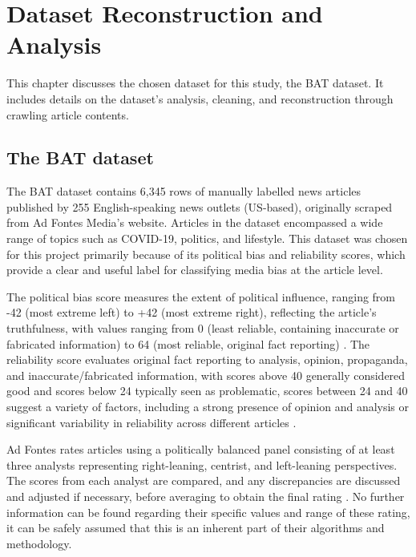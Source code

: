 \chapter{Dataset Reconstruction and Analysis}
\label{cha:3}

This chapter discusses the chosen dataset for this study, the BAT dataset. It includes details on the dataset's analysis, cleaning, and reconstruction through crawling article contents.

\section{The BAT dataset} \label{bat-characteristics}

The BAT dataset \cite{spinde-2023-bat} contains 6,345 rows of manually labelled news articles published by 255 English-speaking news outlets (US-based), originally scraped from Ad Fontes Media's website. Articles in the dataset encompassed a wide range of topics such as COVID-19, politics, and lifestyle. This dataset was chosen for this project primarily because of its political bias and reliability scores, which provide a clear and useful label for classifying media bias at the article level.

The political bias score measures the extent of political influence, ranging from -42 (most extreme left) to +42 (most extreme right), reflecting the article's truthfulness, with values ranging from 0 (least reliable, containing inaccurate or fabricated information) to 64 (most reliable, original fact reporting) \cite{adfontes-bias-reliability}. The reliability score evaluates original fact reporting to analysis, opinion, propaganda, and inaccurate/fabricated information, with scores above 40 generally considered good and scores below 24 typically seen as problematic, scores between 24 and 40 suggest a variety of factors, including a strong presence of opinion and analysis or significant variability in reliability across different articles \cite{adfontes-bias-reliability}.

Ad Fontes rates articles using a politically balanced panel consisting of at least three analysts representing right-leaning, centrist, and left-leaning perspectives. The scores from each analyst are compared, and any discrepancies are discussed and adjusted if necessary, before averaging to obtain the final rating \cite{adfontes-methodology}. No further information can be found regarding their specific values and range of these rating, it can be safely assumed that this is an inherent part of their algorithms and methodology.


